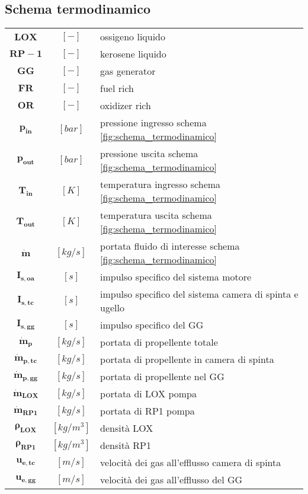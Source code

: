 \begin{multicols}{2}
	\subsection{Schema termodinamico}
	\begin{tabularx}{\linewidth}{cc>{\raggedright\arraybackslash}X}
		$\bm{LOX}$ & $[-]$ & ossigeno liquido \\
		$\bm{RP-1}$ & $[-]$ & kerosene liquido \\
		$\bm{GG}$ & $[-]$ & gas generator \\
		$\bm{FR}$ & $[-]$ & fuel rich \\
		$\bm{OR}$ & $[-]$ & oxidizer rich \\
		$\bm{p_{in}}$ & $[bar]$ & pressione ingresso schema \autoref{fig:schema_termodinamico}\\
		$\bm{p_{out}}$ & $[bar]$ & pressione uscita schema \autoref{fig:schema_termodinamico}\\
		$\bm{T_{in}}$ & $[K]$ & temperatura ingresso schema \autoref{fig:schema_termodinamico}\\
		$\bm{T_{out}}$ & $[K]$ & temperatura uscita schema \autoref{fig:schema_termodinamico}\\
		$\bm{\dot{m}}$ & $[kg/s]$ & portata fluido di interesse schema \autoref{fig:schema_termodinamico}\\
		$\bm{I_{s,oa}}$ & $[s]$ & impulso specifico del sistema motore\\
		$\bm{I_{s,tc}}$ & $[s]$ & impulso specifico del sistema camera di spinta e ugello \\
		$\bm{I_{s,gg}}$ & $[s]$ & impulso specifico del GG\\
		$\bm{\dot{m}_{p}}$ & $[kg/s]$ & portata di propellente totale \\
		$\bm{\dot{m}_{p,tc}}$ & $[kg/s]$ & portata di propellente in camera di spinta \\
		$\bm{\dot{m}_{p,gg}}$ & $[kg/s]$ & portata di propellente nel GG \\
		$\bm{\dot{m}_{LOX}}$ & $[kg/s]$ & portata di LOX pompa \\
		$\bm{\dot{m}_{RP1}}$ & $[kg/s]$ & portata di RP1 pompa\\
		$\bm{\rho_{LOX}}$ & $[kg/m^3]$ & densità LOX \\
		$\bm{\rho_{RP1}}$ & $[kg/m^3]$ & densità RP1 \\
		$\bm{u_{e,tc}}$ & $[m/s]$ & velocità dei gas all'efflusso camera di spinta \\
		$\bm{u_{e,gg}}$ & $[m/s]$ & velocità dei gas all'efflusso del GG \\

\end{tabularx}
\end{multicols}
